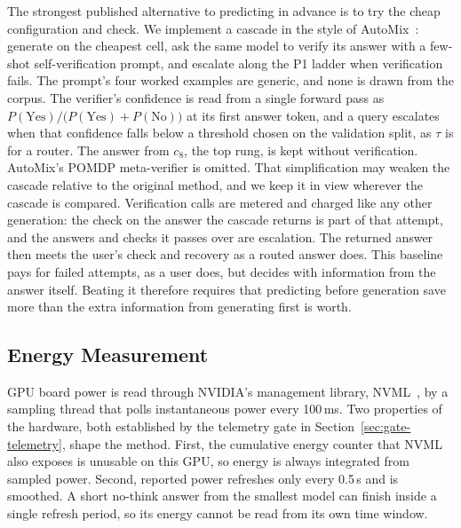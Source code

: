 The strongest published alternative to predicting in advance is to try the
cheap configuration and check. We implement a cascade in the style of
AutoMix~\cite{aggarwal2024automix}: generate on the cheapest cell, ask the
same model to verify its answer with a few-shot self-verification prompt,
and escalate along the P1 ladder when verification fails. The prompt's
four worked examples are generic, and none is drawn from the corpus. The
verifier's confidence is read from a single forward pass as
$P(\text{Yes}) / \bigl(P(\text{Yes}) + P(\text{No})\bigr)$ at its first
answer token, and a query escalates when that confidence falls below a
threshold chosen on the validation split, as $\tau$ is for a router. The
answer from $c_8$, the top rung, is kept without verification. AutoMix's
POMDP meta-verifier is omitted. That simplification may weaken the cascade
relative to the original method, and we keep it in view wherever the
cascade is compared. Verification calls are metered and charged like any
other generation: the check on the answer the cascade returns is part of
that attempt, and the answers and checks it passes over are escalation.
The returned answer then meets the user's check and recovery as a routed
answer does. This baseline pays for failed attempts,
as a user does, but decides with information from the answer itself.
Beating it therefore requires that predicting before generation save more
than the extra information from generating first is worth.

\subsection{Energy Measurement}
\label{sec:energy}

GPU board power is read through NVIDIA's management library, NVML~\cite{nvidia_nvml}, by a sampling thread that polls
instantaneous power every 100\,ms. Two properties of the hardware, both
established by the telemetry gate in Section~\ref{sec:gate-telemetry},
shape the method. First, the cumulative energy counter that NVML also
exposes is unusable on this GPU, so energy is always integrated from sampled
power. Second, reported power refreshes only every 0.5\,s and is smoothed.
A short no-think answer from the smallest model can finish inside a single
refresh period, so its energy cannot be read from its own time window.

